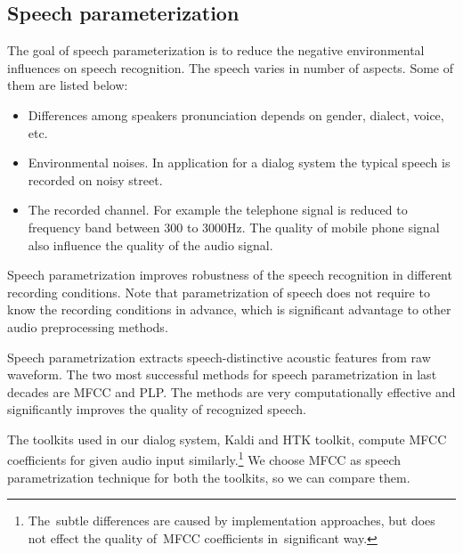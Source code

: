 \subsection{Speech parameterization}
\label{sub:param}
The goal of speech parameterization is to reduce the negative environmental influences on speech recognition.
The speech varies in number of aspects. Some of them are listed below:
\begin{itemize}
    \item Differences among speakers pronunciation depends on gender, dialect, voice, etc.
    \item Environmental noises. In application for a dialog system the typical speech is
        recorded on noisy street. 
    \item The recorded channel. 
        For example the telephone signal is reduced to frequency band between 300 to 3000Hz\cite{TODO}.
        The quality of mobile phone signal also influence the quality of the audio signal.
\end{itemize}

Speech parametrization improves robustness of the speech recognition in different recording conditions.
Note that parametrization of speech does not require to know the recording conditions in advance,
which is significant advantage to other audio preprocessing methods.

Speech parametrization extracts speech-distinctive acoustic features from raw waveform.
The two most successful methods for speech parametrization in last decades are 
\ac{MFCC}\cite{davis1980comparison} and \ac{PLP}\cite{hermansky1990perceptual}.
\cite{TODO_most_succesful} 
The methods are very computationally effective and significantly improves the quality of recognized speech.


The toolkits used in our dialog system, Kaldi and \ac{HTK} toolkit,
compute \ac{MFCC} coefficients for given audio input similarly.\footnote{The~subtle differences are caused by implementation approaches, but does not effect the quality of~\ac{MFCC} coefficients in~significant way.}
We choose \ac{MFCC} as speech parametrization technique for both the toolkits,
so we can compare them.

